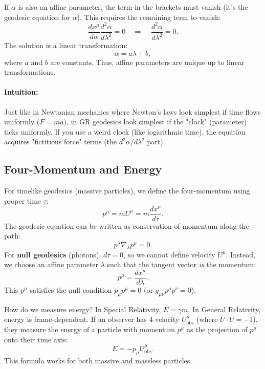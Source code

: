 \documentclass[11pt, a4paper]{report}
\begin{document}
If \(\alpha\) is also an affine parameter, the term in the brackets must vanish (it's the geodesic equation for \(\alpha\)). This requires the remaining term to vanish:
\begin{equation}
\frac{dx^\mu}{d\alpha} \frac{d^2\alpha}{d\lambda^2} = 0 \quad \Longrightarrow \quad \frac{d^2\alpha}{d\lambda^2} = 0.
\end{equation}
The solution is a linear transformation:
\begin{equation}
\alpha = a\lambda + b,
\end{equation}
where \(a\) and \(b\) are constants. Thus, affine parameters are unique up to linear transformations.

\paragraph{Intuition:} Just like in Newtonian mechanics where Newton's laws look simplest if time flows uniformly (\(F=ma\)), in GR geodesics look simplest if the "clock" (parameter) ticks uniformly. If you use a weird clock (like logarithmic time), the equation acquires "fictitious force" terms (the \(d^2\alpha/d\lambda^2\) part).

\subsection*{Four-Momentum and Energy}
For timelike geodesics (massive particles), we define the four-momentum using proper time \(\tau\):
\begin{equation}
p^\mu = m U^\mu = m \frac{dx^\mu}{d\tau}.
\end{equation}
The geodesic equation can be written as conservation of momentum along the path:
\begin{equation}
p^\lambda \nabla_\lambda p^\mu = 0.
\end{equation}
For \textbf{null geodesics} (photons), \(d\tau = 0\), so we cannot define velocity \(U^\mu\). Instead, we choose an affine parameter \(\lambda\) such that the tangent vector \emph{is} the momentum:
\begin{equation}
p^\mu = \frac{dx^\mu}{d\lambda}.
\end{equation}
This \(p^\mu\) satisfies the null condition \(p_\mu p^\mu = 0\) (or \(g_{\mu\nu} p^\mu p^\nu = 0\)).

How do we measure energy? In Special Relativity, \(E = \gamma m\). In General Relativity, energy is frame-dependent. If an observer has 4-velocity \(U^\mu_{\text{obs}}\) (where \(U \cdot U = -1\)), they measure the energy of a particle with momentum \(p^\mu\) as the projection of \(p^\mu\) onto their time axis:
\begin{equation}
E = - p_\mu U^\mu_{\text{obs}}.
\end{equation}
This formula works for both massive and massless particles.
\end{document}

